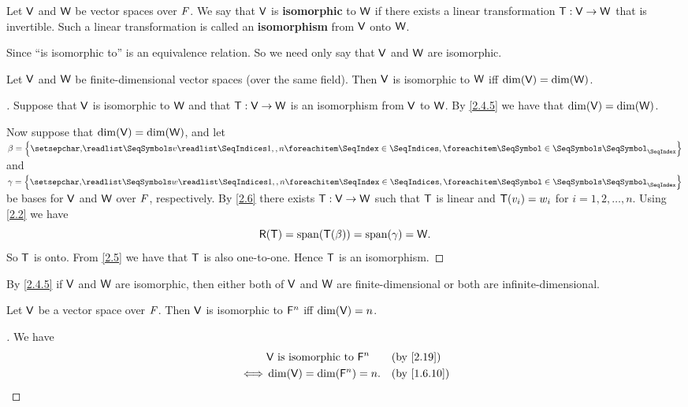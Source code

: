 \begin{defn}\label{2.4.8}
  Let \(\mathsf{V}\) and \(\mathsf{W}\) be vector spaces over \(\mathit{F}\).
  We say that \(\mathsf{V}\) is \textbf{isomorphic} to \(\mathsf{W}\) if there exists a linear transformation \(\mathsf{T} : \mathsf{V} \to \mathsf{W}\) that is invertible.
  Such a linear transformation is called an \textbf{isomorphism} from \(\mathsf{V}\) onto \(\mathsf{W}\).
\end{defn}

\begin{note}
  Since ``is isomorphic to'' is an equivalence relation.
  So we need only say that \(\mathsf{V}\) and \(\mathsf{W}\) are isomorphic.
\end{note}

\begin{thm}\label{2.19}
  Let \(\mathsf{V}\) and \(\mathsf{W}\) be finite-dimensional vector spaces (over the same field).
  Then \(\mathsf{V}\) is isomorphic to \(\mathsf{W}\) iff \(\dim(\mathsf{V}) = \dim(\mathsf{W})\).
\end{thm}

\begin{proof}[]
  Suppose that \(\mathsf{V}\) is isomorphic to \(\mathsf{W}\) and that \(\mathsf{T} : \mathsf{V} \to \mathsf{W}\) is an isomorphism from \(\mathsf{V}\) to \(\mathsf{W}\).
  By \cref{2.4.5} we have that \(\dim(\mathsf{V}) = \dim(\mathsf{W})\).

  Now suppose that \(\dim(\mathsf{V}) = \dim(\mathsf{W})\), and let \(\beta = \set{\seq{v}{1,,n}}\) and \(\gamma = \set{\seq{w}{1,,n}}\) be bases for \(\mathsf{V}\) and \(\mathsf{W}\) over \(\mathit{F}\), respectively.
  By \cref{2.6} there exists \(\mathsf{T} : \mathsf{V} \to \mathsf{W}\) such that \(\mathsf{T}\) is linear and \(\mathsf{T}(v_i) = w_i\) for \(i = 1, 2, \dots, n\).
  Using \cref{2.2} we have
  \[
    \rg{\T} = \spn{\T(\beta)} = \spn{\gamma} = \W.
  \]
  So \(\mathsf{T}\) is onto.
  From \cref{2.5} we have that \(\mathsf{T}\) is also one-to-one.
  Hence \(\mathsf{T}\) is an isomorphism.
\end{proof}

\begin{note}
  By \cref{2.4.5} if \(\mathsf{V}\) and \(\mathsf{W}\) are isomorphic, then either both of \(\mathsf{V}\) and \(\mathsf{W}\) are finite-dimensional or both are infinite-dimensional.
\end{note}

\begin{cor}\label{2.4.9}
  Let \(\mathsf{V}\) be a vector space over \(\mathit{F}\).
  Then \(\mathsf{V}\) is isomorphic to \(\mathsf{F}^n\) iff \(\dim(\mathsf{V}) = n\).
\end{cor}

\begin{proof}[]
  We have
  \begin{align*}
         & \V \text{ is isomorphic to } \vs{F}^n &  & \text{(by \cref{2.19})}   \\
    \iff & \dim(\V) = \dim(\vs{F}^n) = n.        &  & \text{(by \cref{1.6.10})}
  \end{align*}
\end{proof}

